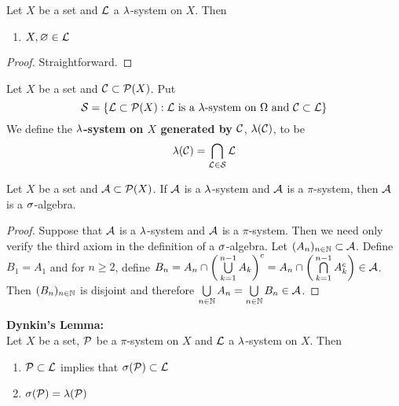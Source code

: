 \documentclass{book}
\begin{document}
	\begin{ex} 
		Let $X$ be a set and $\mathcal{L}$ a $\lambda$-system on $X$. Then 
		\begin{enumerate}
			\item $X, \varnothing \in \mathcal{L}$
		\end{enumerate} 
	\end{ex}
	
	\begin{proof}
		Straightforward.
	\end{proof}
	
	\begin{defn} 
		Let $X$ be a set and $\mathcal{C} \subset \mathcal{P}(X)$. Put $$\mathcal{S} = \{\mathcal{L} \subset \mathcal{P}(X): \mathcal{L} \text{ is a }\lambda\text{-system on }\Omega \text{ and } \mathcal{C} \subset \mathcal{L}\}$$ We define the \textbf{$\lambda$-system on $X$ generated by $\mathcal{C}$}, $\lambda(\mathcal{C})$, to be $$\lambda(\mathcal{C}) = \bigcap_{\mathcal{L} \in \mathcal{S}}\mathcal{L}$$
	\end{defn}
	
	\begin{ex} 
		Let $X$ be a set and $\mathcal{A} \subset \mathcal{P}(X)$. If $\mathcal{A}$ is a $\lambda$-system and $\mathcal{A}$ is a $\pi$-system, then $\mathcal{A}$ is a $\sigma$-algebra.
	\end{ex}
	
	\begin{proof}
		Suppose that $\mathcal{A}$ is a $\lambda$-system and $\mathcal{A}$ is a $\pi$-system. Then we need only verify the third axiom in the definition of a $\sigma$-algebra. Let $(A_n)_{n \in \mathbb{N}} \subset \mathcal{A}$. Define $B_1 = A_1$ and for $n \geq 2$, define $B_n = A_n \cap \bigg( \bigcup\limits_{k=1}^{n-1}A_k \bigg)^c = A_n \cap \bigg( \bigcap\limits_{k=1}^{n-1}A_k^c \bigg) \in \mathcal{A}$. Then $(B_n)_{n \in \mathbb{N}}$ is disjoint and therefore $\bigcup\limits_{n \in \mathbb{N}}A_n = \bigcup\limits_{n \in \mathbb{N}}B_n \in \mathcal{A}$.
	\end{proof}
	
	\begin{thm}  \textbf{Dynkin's Lemma:} \\
		Let $X$ be a set, $\mathcal{P}$ be a $\pi$-system on $X$ and $\mathcal{L}$ a $\lambda$-system on $X$. Then
		\begin{enumerate}
			\item $\mathcal{P} \subset \mathcal{L}$ implies that $\sigma(\mathcal{P}) \subset \mathcal{L}$ 
			\item $\sigma(\mathcal{P}) = \lambda(\mathcal{P})$
		\end{enumerate} 
	\end{thm}
	
\end{document}
